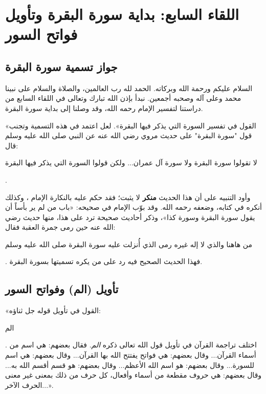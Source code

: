 \chapter{اللقاء السابع: بداية سورة البقرة وتأويل فواتح السور}

\section{جواز تسمية سورة البقرة}
السلام عليكم ورحمة الله وبركاته. الحمد لله رب العالمين، والصلاة والسلام على نبينا محمد وعلى آله وصحبه أجمعين. نبدأ بإذن الله تبارك وتعالى في اللقاء السابع من دراستنا لتفسير الإمام  رحمه الله، وقد وصلنا إلى بداية سورة البقرة.

 «القول في تفسير السورة التي يذكر فيها البقرة».
لعل  اعتمد في هذه التسمية وتجنب قول "سورة البقرة" على حديث مروي   رضي الله عنه عن النبي صلى الله عليه وسلم قال: \begin{hadith}لا تقولوا سورة البقرة ولا سورة آل عمران... ولكن قولوا السورة التي يذكر فيها البقرة\end{hadith}.

وأود التنبيه على أن هذا الحديث \textbf{منكر} لا يثبت؛ فقد حكم عليه بالنكارة الإمام ، وكذلك أنكره  في كتابه، وضعفه  رحمه الله. 
وقد بوّب الإمام  في صحيحه: «باب من لم ير بأساً أن يقول سورة البقرة وسورة كذا»، وذكر أحاديث صحيحة ترد على هذا، منها حديث  رضي الله عنه حين رمى جمرة العقبة فقال: \begin{hadith}من هاهنا والذي لا إله غيره رمى الذي أُنزلت عليه سورة البقرة صلى الله عليه وسلم\end{hadith}. فهذا الحديث الصحيح فيه رد على من يكره تسميتها بسورة البقرة.

\separator

\section{تأويل (الم) وفواتح السور}
 «القول في تأويل قوله جل ثناؤه: \begin{ayah}الم\end{ayah}. اختلف تراجمة القرآن في تأويل قول الله تعالى ذكره \textit{الم}. فقال بعضهم: هي اسم من أسماء القرآن... وقال بعضهم: هي فواتح يفتتح الله بها القرآن... وقال بعضهم: هي اسم للسورة... وقال بعضهم: هو اسم الله الأعظم... وقال بعضهم: هو قسم أقسم الله به... وقال بعضهم: هي حروف مقطعة من أسماء وأفعال، كل حرف من ذلك بمعنى غير معنى الحرف الآخر...».

